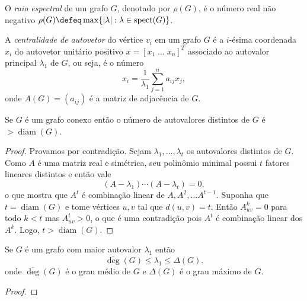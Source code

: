 \documentclass{article}
\DeclareMathOperator{\spect}{spect}
\begin{document}
\begin{defn}
    O \emph{raio espectral} de um grafo \(G\), denotado por \(\rho(G)\), é o número real não negativo \(\rho(G) \defeq \max\{|\lambda| : \lambda \in \spect(G)\}\).
\end{defn}

\begin{defn}
    A \emph{centralidade de autovetor} do vértice \(v_i\) em um grafo \(G\) é a \(i\)-ésima coordenada \(x_i\) do autovetor unitário positivo \(x = [x_1 \; \ldots \; x_n]^T\) associado ao autovalor principal \(\lambda_1\) de \(G\), ou seja, é o número
    \begin{equation}
        x_i = \frac{1}{\lambda_1} \sum_{j=1}^n a_{ij} x_j,
    \end{equation}
    onde \(A(G) = (a_{ij})\) é a matriz de adjacência de \(G\).
\end{defn}

\begin{prop}
    Se \(G\) é um grafo conexo então o número de autovalores distintos de \(G\) é \(> \operatorname{diam}(G)\).
\end{prop}

\begin{proof}
    Provamos por contradição. Sejam \(\lambda_1, \ldots, \lambda_t\) os autovalores distintos de \(G\). Como \(A\) é uma matriz real e simétrica, seu polinômio minimal possui \(t\) fatores lineares distintos e então vale
    \[
        (A-\lambda_1) \cdots (A-\lambda_t) = 0,
    \]
    o que mostra que \(A^t\) é combinação linear de \(A, A^2, \ldots A^{t-1}\). Suponha que \(t = \operatorname{diam}(G)\) e tome vértices \(u, v\) tal que \(d(u,v) = t\). Então \(A_{uv}^k = 0\) para todo \(k < t\) mas \(A_{uv}^t > 0\), o que é uma contradição pois \(A^t\) é combinação linear dos \(A^k\). Logo, \(t > \operatorname{diam}(G)\).
\end{proof}

\begin{prop}
    Se \(G\) é um grafo com maior autovalor \(\lambda_1\) então
    \begin{equation}
        \overline{\deg}(G) \leq \lambda_1 \leq \Delta(G).
    \end{equation}
    onde \(\overline{\deg}(G)\) é o grau médio de \(G\) e \(\Delta(G)\) é o grau máximo de \(G\).
\end{prop}

\begin{proof}
    
\end{proof}
\end{document}
